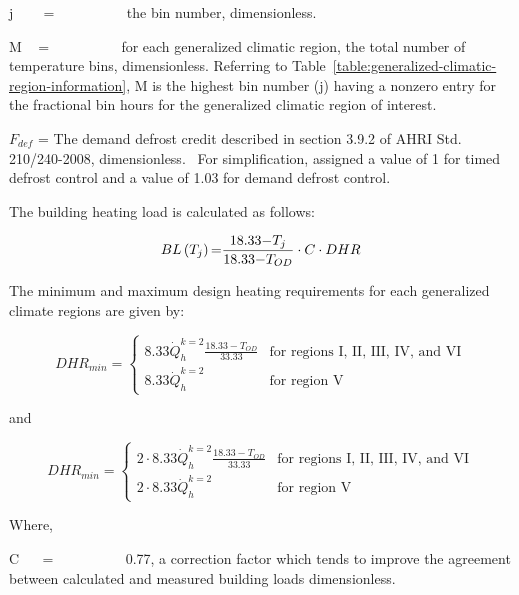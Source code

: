 j ~~~ = ~~~~~~~~~ the bin number, dimensionless.

M ~ = ~~~~~~~~~ for each generalized climatic region, the total number of temperature bins, dimensionless. Referring to Table~\ref{table:generalized-climatic-region-information}, M is the highest bin number (j) having a nonzero entry for the fractional bin hours for the generalized climatic region of interest.

\({F_{def}}\) = The demand defrost credit described in section 3.9.2 of AHRI Std. 210/240-2008, dimensionless.~ For simplification, assigned a value of 1 for timed defrost control and a value of 1.03 for demand defrost control.

The building heating load is calculated as follows:

\begin{equation}
BL\left( {{T_j}} \right){\rm{ = }}\frac{{{\rm{18}}{\rm{.33 - }}{T_j}}}{{{\rm{18}}{\rm{.33 - }}{T_{OD}}}} \cdot C \cdot DHR
\end{equation}

The minimum and maximum design heating requirements for each generalized climate regions are given by:

\begin{equation}
DHR_{min} = \left\{  \begin{array}{cl}
                         8.33 \dot{Q}_h^{k = 2} \frac{18.33-T_{OD}}{33.33} & \text{for regions I, II, III, IV, and VI} \\
                         8.33 \dot{Q}_h^{k = 2} & \text{for region V}
                     \end{array}
            \right.
\end{equation}

and

\begin{equation}
DHR_{min} = \left\{  \begin{array}{cl}
                         2 \cdot 8.33 \dot{Q}_h^{k = 2} \frac{18.33-T_{OD}}{33.33} & \text{for regions I, II, III, IV, and VI} \\
                         2 \cdot 8.33 \dot{Q}_h^{k = 2} & \text{for region V}
                     \end{array}
            \right.
\end{equation}

Where,

C ~~ = ~~~~~~~~~ 0.77, a correction factor which tends to improve the agreement between calculated and measured building loads dimensionless.

